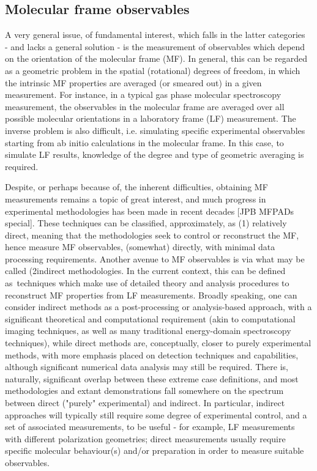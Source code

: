 \subsection{Molecular frame observables}

A very general issue, of fundamental interest, which falls in the latter categories  - and lacks a general solution - is the measurement of observables which depend on the orientation of the molecular frame (MF). In general, this can be regarded as a geometric problem in the spatial (rotational) degrees of freedom, in which the intrinsic MF properties are averaged (or smeared out) in a given measurement. For instance, in a typical gas phase molecular spectroscopy measurement, the observables in the molecular frame  are averaged over all possible molecular orientations in a laboratory frame (LF) measurement. The inverse problem is also difficult, i.e. simulating specific experimental observables starting from ab initio calculations in the molecular frame. In this case, to simulate LF results, knowledge of the degree and type of geometric averaging is required. 

Despite, or perhaps because of, the inherent difficulties, obtaining  MF measurements remains a topic of great interest, and much progress in experimental methodologies has been made in recent decades \cite{Reid2012, Yagishita2015} [JPB MFPADs special]. These techniques can be classified, approximately, as (1) relatively direct, meaning that the methodologies seek to control or reconstruct the MF, hence measure MF observables, (somewhat) directly, with minimal data processing requirements. Another avenue to MF observables is via what may be called (2indirect methodologies. In the current context, this can be defined as techniques which make use of detailed theory and analysis procedures to reconstruct MF properties from LF measurements. Broadly speaking, one can consider indirect methods as a post-processing or analysis-based approach, with a significant theoretical and computational requirement (akin to computational imaging techniques, as well as many traditional energy-domain spectroscopy techniques), while direct methods are, conceptually, closer to purely experimental methods, with more emphasis placed on detection techniques and capabilities, although significant numerical data analysis may still be required. There is, naturally, significant overlap between these extreme case definitions, and most methodologies and extant demonstrations fall somewhere on the spectrum between direct ("purely" experimental) and indirect. In particular, indirect approaches will typically still require some degree of experimental control, and a set of associated measurements, to be useful - for example, LF measurements with different polarization geometries; direct measurements usually require specific molecular behaviour(s) and/or preparation in order to measure suitable observables.